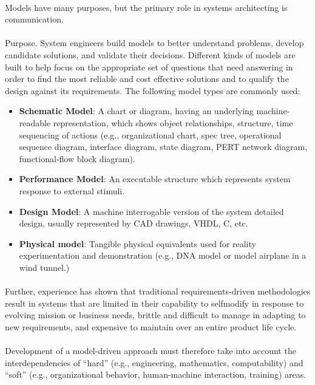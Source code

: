 \documentclass[a4paper,12pt,twoside]{report}
\begin{document}
{			\paragraph{} {Models have many purposes, but the primary role in systems architecting is communication. \cite{MBSESystemArchitectureNavalShipDesign}
			}
			
			\paragraph{} {Purpose. System engineers build models to better understand problems, develop candidate solutions, and validate their decisions. Different kinds of models are built to help focus on the appropriate set of questions that need answering in order to find the most reliable and cost effective solutions and to qualify the design against its requirements. The following model types are commonly used:
				\begin{itemize}
					\item \textbf{Schematic Model}: A chart or diagram, having an underlying machine-readable representation, which shows object relationships, structure, time sequencing of actions (e.g., organizational chart, spec tree, operational sequence diagram, interface diagram, state diagram, PERT network diagram, functional-flow block diagram).
					\item \textbf{Performance Model}: An executable structure which represents system response to external stimuli.
					\item \textbf{Design Model}: A machine interrogable version of the system detailed design, usually represented by CAD drawings, VHDL, C, etc.
					\item  \textbf{Physical model}: Tangible physical equivalents used for reality experimentation and demonstration (e.g., DNA model or model airplane in a wind tunnel.)
				\end{itemize}
			}
			\paragraph{}{Further, experience has shown that traditional requirements-driven methodologies result in systems that are limited in their capability to selfmodify in response to evolving mission or business needs, brittle and difficult to manage in adapting to new requirements, and expensive to maintain over an entire product life cycle.
			}
			
			\paragraph{} {Development of a model-driven approach must therefore take into account the interdependencies of “hard” (e.g., engineering, mathematics, computability) and “soft” (e.g., organizational behavior, human-machine interaction, training) areas. \cite{FoundationalConceptsMDSD}
			}
			
}
\end{document}
